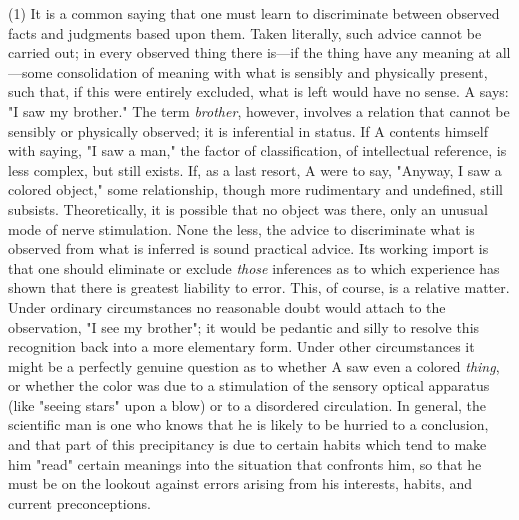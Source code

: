 \documentclass[showtrims,ustradepaper]{memoir}
\begin{document}
(1) It is a common saying that one must learn to discriminate between
observed facts and judgments based upon them. Taken literally, such
advice cannot be carried out; in every observed thing there is---if the
thing have any meaning at all---some consolidation of meaning with what
is sensibly and physically present, such that, if this were entirely
excluded, what is left would have no sense. A says: "I saw my brother."
The term \emph{brother}, however, involves a relation that cannot be
sensibly or physically observed; it is inferential in status. If A
contents himself with saying, "I saw a man," the factor of
classification, of intellectual reference, is less complex, but still
exists. If, as a last resort, A were to say, "Anyway, I saw a colored
object," some relationship, though more rudimentary and undefined, still
subsists. Theoretically, it is possible that
no
object was there, only an unusual mode of nerve stimulation. None the
less, the advice to discriminate what is observed from what is inferred
is sound practical advice. Its working import is that one should
eliminate or exclude \emph{those} inferences as to which experience has
shown that there is greatest liability to error. This, of course, is a
relative matter. Under ordinary circumstances no reasonable doubt would
attach to the observation, "I see my brother"; it would be pedantic and
silly to resolve this recognition back into a more elementary form.
Under other circumstances it might be a perfectly genuine question as to
whether A saw even a colored \emph{thing}, or whether the color was due
to a stimulation of the sensory optical apparatus (like "seeing stars"
upon a blow) or to a disordered circulation. In general, the scientific
man is one who knows that he is likely to be hurried to a conclusion,
and that part of this precipitancy is due to certain habits which tend
to make him "read" certain meanings into the situation that confronts
him, so that he must be on the lookout against errors arising from his
interests, habits, and current preconceptions.

\end{document}
